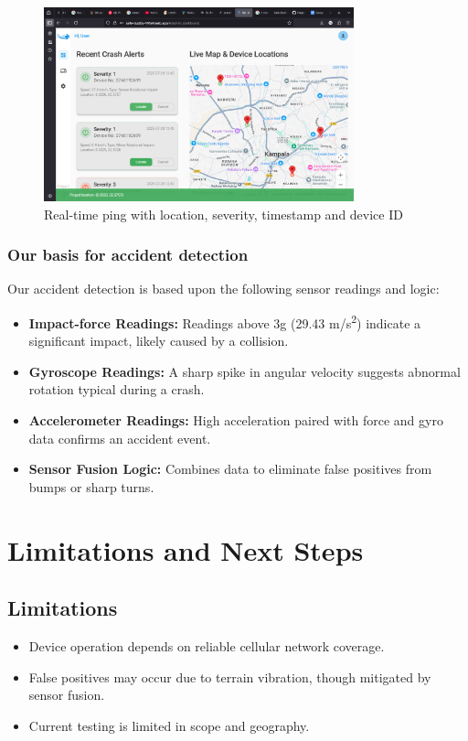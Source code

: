 \documentclass[12pt]{article}
\begin{document}
\begin{figure}[H]
  \centering
  \includegraphics[width=0.8\textwidth]{Realtime.png}
  \caption{Real-time ping with location, severity, timestamp and device ID}
  \label{fig:realtime}
\end{figure}

\subsubsection{Our basis for accident detection}
Our accident detection is based upon the following sensor readings and logic:

\begin{itemize}
  \item \textbf{Impact-force Readings:} Readings above 3g (29.43 m/s\textsuperscript{2}) indicate a significant impact, likely caused by a collision.
  \item \textbf{Gyroscope Readings:} A sharp spike in angular velocity suggests abnormal rotation typical during a crash.
  \item \textbf{Accelerometer Readings:} High acceleration paired with force and gyro data confirms an accident event.
  \item \textbf{Sensor Fusion Logic:} Combines data to eliminate false positives from bumps or sharp turns.
\end{itemize}

\section{Limitations and Next Steps}

\subsection{Limitations}
\begin{itemize}
  \item Device operation depends on reliable cellular network coverage.
  \item False positives may occur due to terrain vibration, though mitigated by sensor fusion.
  \item Current testing is limited in scope and geography.
\end{itemize}
\end{document}
